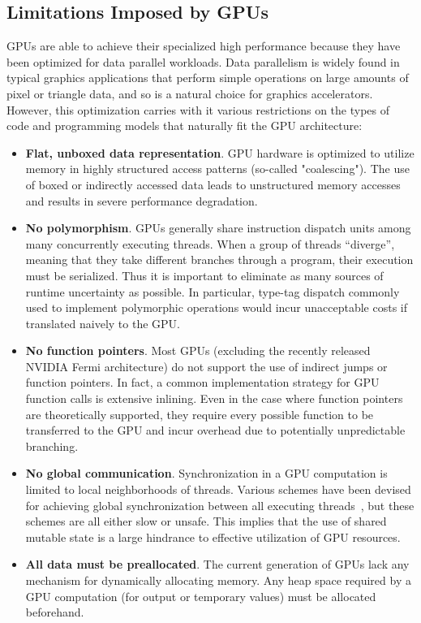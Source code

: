 \documentclass[preprint]{sigplanconf}
\begin{document}
\subsection{Limitations Imposed by GPUs}
\label{GPULimitations}
GPUs are able to achieve their specialized high performance because they have
been optimized for data parallel workloads. 
Data parallelism is widely found in typical graphics applications
that perform simple operations on large amounts of pixel or triangle data, and
so is a natural choice for graphics accelerators.  However, this optimization
carries with it various restrictions on the types of code and programming models
that naturally fit the GPU architecture:

\begin{itemize}
\item \textbf{Flat, unboxed data representation}. GPU hardware is optimized to
utilize memory in highly structured access patterns (so-called "coalescing"). 
The use of boxed or indirectly accessed data leads to 
unstructured memory accesses
and results in severe performance degradation.

\item \textbf{No polymorphism}. GPUs generally share instruction dispatch units
among many concurrently executing threads. When a group of threads
``diverge'', meaning that they take different branches through a program, their
execution must be serialized. Thus it is important to eliminate as many sources
of runtime uncertainty as possible. In particular, type-tag dispatch commonly
used to implement polymorphic operations would incur unacceptable costs if
translated naively to the GPU.

\item \textbf {No function pointers}. Most GPUs (excluding the recently released
NVIDIA Fermi architecture) do not support the use of indirect jumps or function
pointers. In fact, a common implementation strategy for GPU function calls is
extensive inlining. Even in the case where function pointers are theoretically
supported, they require every possible function to be transferred to the GPU and
incur overhead due to potentially unpredictable branching. 

\item \textbf{No global communication}. Synchronization in a GPU computation is
limited to local neighborhoods of threads. Various schemes have been devised for
achieving global synchronization between all executing threads~\cite{feng10},
but these schemes are all either slow or unsafe. This implies that the use of
shared mutable state is a large hindrance to effective utilization of GPU
resources.

\item \textbf{All data must be preallocated}. The current generation of GPUs
lack any mechanism for dynamically allocating memory. Any heap space required by
a GPU computation (for output or temporary values) must be allocated
beforehand. 
\end{itemize}
\end{document}
